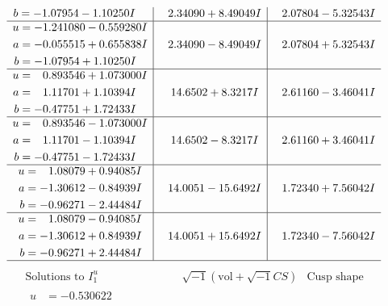 \documentclass[1p]{elsarticle_modified}
\theoremstyle{definition}
\newcommand{\I}{\sqrt{-1}}
\begin{document}
$$\begin{array}{c|c|c}
\begin{aligned}
b &= -1.07954 - 1.10250 I\end{aligned}
 & \phantom{-}2.34090 + 8.49049 I & \phantom{-}2.07804 - 5.32543 I \\ \hline\begin{aligned}
u &= -1.241080 - 0.559280 I \\
a &= -0.055515 + 0.655838 I \\
b &= -1.07954 + 1.10250 I\end{aligned}
 & \phantom{-}2.34090 - 8.49049 I & \phantom{-}2.07804 + 5.32543 I \\ \hline\begin{aligned}
u &= \phantom{-}0.893546 + 1.073000 I \\
a &= \phantom{-}1.11701 + 1.10394 I \\
b &= -0.47751 + 1.72433 I\end{aligned}
 & \phantom{-}14.6502 + 8.3217 I & \phantom{-}2.61160 - 3.46041 I \\ \hline\begin{aligned}
u &= \phantom{-}0.893546 - 1.073000 I \\
a &= \phantom{-}1.11701 - 1.10394 I \\
b &= -0.47751 - 1.72433 I\end{aligned}
 & \phantom{-}14.6502 - 8.3217 I & \phantom{-}2.61160 + 3.46041 I \\ \hline\begin{aligned}
u &= \phantom{-}1.08079 + 0.94085 I \\
a &= -1.30612 - 0.84939 I \\
b &= -0.96271 - 2.44484 I\end{aligned}
 & \phantom{-}14.0051 - 15.6492 I & \phantom{-}1.72340 + 7.56042 I \\ \hline\begin{aligned}
u &= \phantom{-}1.08079 - 0.94085 I \\
a &= -1.30612 + 0.84939 I \\
b &= -0.96271 + 2.44484 I\end{aligned}
 & \phantom{-}14.0051 + 15.6492 I & \phantom{-}1.72340 - 7.56042 I\\
 \hline 
 \end{array}$$\newpage$$\begin{array}{c|c|c}  
\text{Solutions to }I^u_{1}& \I (\text{vol} + \sqrt{-1}CS) & \text{Cusp shape}\\
 \hline 
\begin{aligned}
u &= -0.530622\phantom{ +0.000000I} \\

\end{aligned}
\end{array}$$
\end{document}
